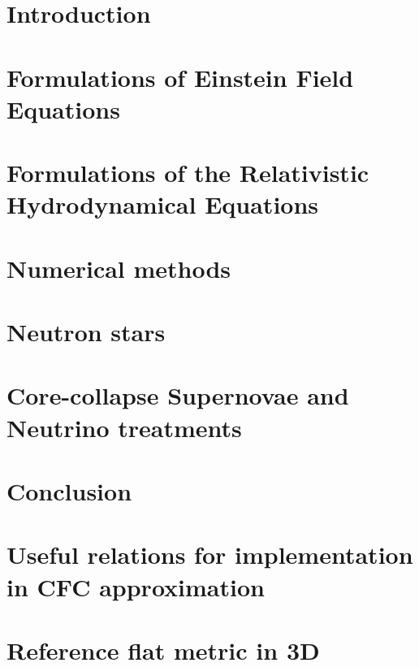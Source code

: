 \documentclass[12pt,twoside]{report}
\begin{document}
\chapter{Introduction}

\chapter{\label{ch:einstein_eq}Formulations of Einstein Field Equations}

\chapter{Formulations of the Relativistic Hydrodynamical Equations}
\chapter{Numerical methods}

%
%
\chapter{Neutron stars}


\chapter{Core-collapse Supernovae and Neutrino treatments}


\chapter{Conclusion}



\appendix


\chapter{\label{appendix:cfc_equations}Useful relations for implementation in CFC approximation}


\chapter{Reference flat metric in 3D}

\end{document}
